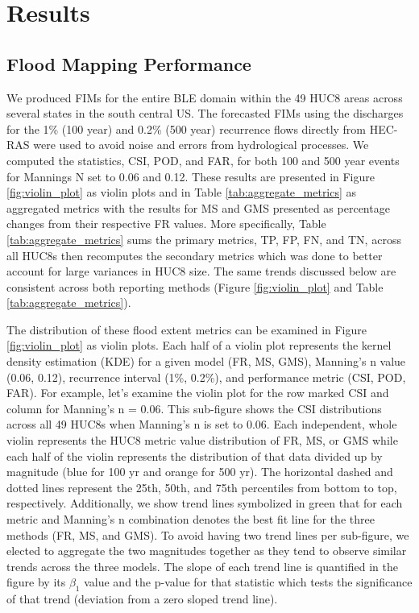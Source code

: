 \section{Results}
\label{sec:results}
%
\subsection{Flood Mapping Performance}
\label{ssec:flood_mapping_performance}
%
We produced FIMs for the entire BLE domain within the 49 HUC8 areas across several states in the south central US. 
The forecasted FIMs using the discharges for the 1\% (100 year) and 0.2\% (500 year) recurrence flows directly from HEC-RAS were used to avoid noise and errors from hydrological processes.
We computed the statistics, CSI, POD, and FAR, for both 100 and 500 year events for Mannings N set to 0.06 and 0.12.
These results are presented in Figure \ref{fig:violin_plot} as violin plots and in Table \ref{tab:aggregate_metrics} as aggregated metrics with the results for MS and GMS presented as percentage changes from their respective FR values.
More specifically, Table \ref{tab:aggregate_metrics} sums the primary metrics, TP, FP, FN, and TN, across all HUC8s then recomputes the secondary metrics which was done to better account for large variances in HUC8 size.
The same trends discussed below are consistent across both reporting methods (Figure \ref{fig:violin_plot} and Table \ref{tab:aggregate_metrics}).

The distribution of these flood extent metrics can be examined in Figure \ref{fig:violin_plot} as violin plots.
Each half of a violin plot represents the kernel density estimation (KDE) for a given model (FR, MS, GMS), Manning's n value (0.06, 0.12), recurrence interval (1\%, 0.2\%), and performance metric (CSI, POD, FAR).
For example, let's examine the violin plot for the row marked CSI and column for Manning's n = 0.06.
This sub-figure shows the CSI distributions across all 49 HUC8s when Manning's n is set to 0.06.
Each independent, whole violin represents the HUC8 metric value distribution of FR, MS, or GMS while each half of the violin represents the distribution of that data divided up by magnitude (blue for 100 yr and orange for 500 yr).
The horizontal dashed and dotted lines represent the 25th, 50th, and 75th percentiles from bottom to top, respectively.
Additionally, we show trend lines symbolized in green that for each metric and Manning's n combination denotes the best fit line for the three methods (FR, MS, and GMS).
To avoid having two trend lines per sub-figure, we elected to aggregate the two magnitudes together as they tend to observe similar trends across the three models.
The slope of each trend line is quantified in the figure by its $\beta_1$ value and the p-value for that statistic which tests the significance of that trend (deviation from a zero sloped trend line).

